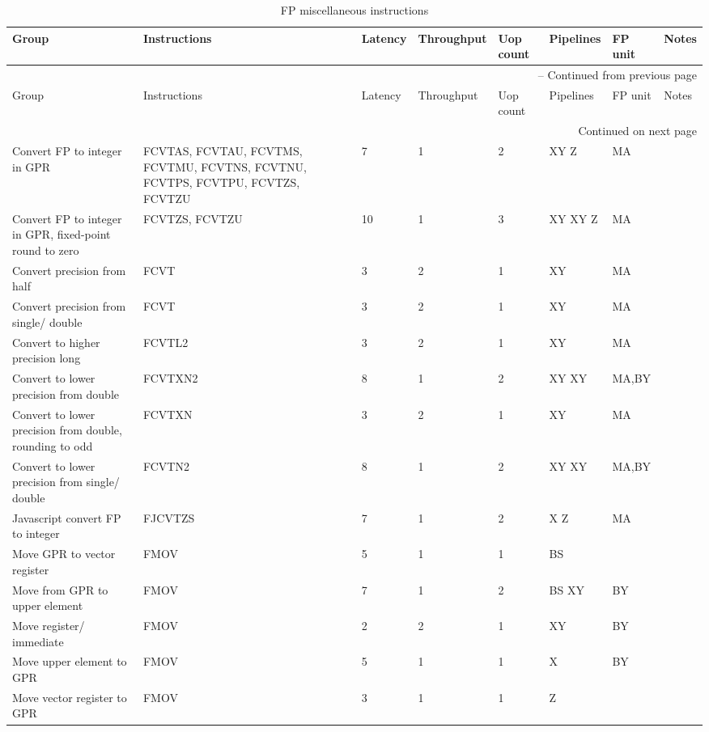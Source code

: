 \begin{longtable}{|p{1in}|p{1in}|l|l|l|p{1in}|l|p{1in}|}
\caption{FP miscellaneous instructions} \\
\hline
Group & Instructions & Latency & Throughput & Uop count & Pipelines & FP unit & Notes\\
\hline
\endfirsthead
\hline
\multicolumn{8}{|r|}{{\tablename\ \thetable{} -- Continued from previous page}} \\
\hline
Group & Instructions & Latency & Throughput & Uop count & Pipelines & FP unit & Notes\\
\hline
\endhead
\hline
\multicolumn{8}{|r|}{{Continued on next page}} \\
\hline
\endfoot
\hline
\endlastfoot
Convert FP to integer in GPR & FCVTAS, FCVTAU, FCVTMS, FCVTMU, FCVTNS, FCVTNU, FCVTPS, FCVTPU, FCVTZS, FCVTZU & 7 & 1 & 2 & XY Z & MA & \\
\hline
Convert FP to integer in GPR, fixed-point round to zero & FCVTZS, FCVTZU & 10 & 1 & 3 & XY XY Z & MA & \\
\hline
Convert precision from half & FCVT & 3 & 2 & 1 & XY & MA & \\
\hline
Convert precision from single/ double & FCVT & 3 & 2 & 1 & XY & MA & \\
\hline
Convert to higher precision long & FCVTL{{2}} & 3 & 2 & 1 & XY & MA & \\
\hline
Convert to lower precision from double & FCVTXN{{2}} & 8 & 1 & 2 & XY XY & MA,BY & \\
\hline
Convert to lower precision from double, rounding to odd & FCVTXN & 3 & 2 & 1 & XY & MA & \\
\hline
Convert to lower precision from single/ double & FCVTN{{2}} & 8 & 1 & 2 & XY XY & MA,BY & \\
\hline
Javascript convert FP to integer & FJCVTZS & 7 & 1 & 2 & X Z & MA & \\
\hline
Move GPR to vector register & FMOV & 5 & 1 & 1 & BS &  & \\
\hline
Move from GPR to upper element & FMOV & 7 & 1 & 2 & BS XY & BY & \\
\hline
Move register/ immediate & FMOV & 2 & 2 & 1 & XY & BY & \\
\hline
Move upper element to GPR & FMOV & 5 & 1 & 1 & X & BY & \\
\hline
Move vector register to GPR & FMOV & 3 & 1 & 1 & Z &  & \\
\hline
\end{longtable}
